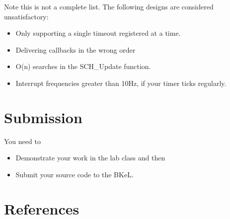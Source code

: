 Note this is not a complete list. The following designs are considered unsatisfactory:
\begin{itemize}
    \item Only supporting a single timeout registered at a time.
    \item Delivering callbacks in the wrong order
    \item O(n) searches in the SCH\_Update function.
    \item Interrupt frequencies greater than 10Hz, if your timer ticks regularly.
\end{itemize}





\section{Submission}

You need to 
\begin{itemize}
    \item Demonstrate your work in the lab class and then
    \item Submit your source code to the BKeL.    
\end{itemize}

\section{References}